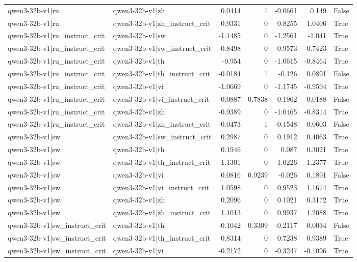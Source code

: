 \begin{table}
\begin{tabular}{l l r r r r l}
qwen3-32b-v1|ru & qwen3-32b-v1|zh & 0.0414 & 1 & -0.0661 & 0.149 & False \\
qwen3-32b-v1|ru & qwen3-32b-v1|zh_instruct_crit & 0.9331 & 0 & 0.8255 & 1.0406 & True \\
qwen3-32b-v1|ru_instruct_crit & qwen3-32b-v1|sw & -1.1485 & 0 & -1.2561 & -1.041 & True \\
qwen3-32b-v1|ru_instruct_crit & qwen3-32b-v1|sw_instruct_crit & -0.8498 & 0 & -0.9573 & -0.7423 & True \\
qwen3-32b-v1|ru_instruct_crit & qwen3-32b-v1|th & -0.954 & 0 & -1.0615 & -0.8464 & True \\
qwen3-32b-v1|ru_instruct_crit & qwen3-32b-v1|th_instruct_crit & -0.0184 & 1 & -0.126 & 0.0891 & False \\
qwen3-32b-v1|ru_instruct_crit & qwen3-32b-v1|vi & -1.0669 & 0 & -1.1745 & -0.9594 & True \\
qwen3-32b-v1|ru_instruct_crit & qwen3-32b-v1|vi_instruct_crit & -0.0887 & 0.7838 & -0.1962 & 0.0188 & False \\
qwen3-32b-v1|ru_instruct_crit & qwen3-32b-v1|zh & -0.9389 & 0 & -1.0465 & -0.8314 & True \\
qwen3-32b-v1|ru_instruct_crit & qwen3-32b-v1|zh_instruct_crit & -0.0473 & 1 & -0.1548 & 0.0603 & False \\
qwen3-32b-v1|sw & qwen3-32b-v1|sw_instruct_crit & 0.2987 & 0 & 0.1912 & 0.4063 & True \\
qwen3-32b-v1|sw & qwen3-32b-v1|th & 0.1946 & 0 & 0.087 & 0.3021 & True \\
qwen3-32b-v1|sw & qwen3-32b-v1|th_instruct_crit & 1.1301 & 0 & 1.0226 & 1.2377 & True \\
qwen3-32b-v1|sw & qwen3-32b-v1|vi & 0.0816 & 0.9239 & -0.026 & 0.1891 & False \\
qwen3-32b-v1|sw & qwen3-32b-v1|vi_instruct_crit & 1.0598 & 0 & 0.9523 & 1.1674 & True \\
qwen3-32b-v1|sw & qwen3-32b-v1|zh & 0.2096 & 0 & 0.1021 & 0.3172 & True \\
qwen3-32b-v1|sw & qwen3-32b-v1|zh_instruct_crit & 1.1013 & 0 & 0.9937 & 1.2088 & True \\
qwen3-32b-v1|sw_instruct_crit & qwen3-32b-v1|th & -0.1042 & 0.3309 & -0.2117 & 0.0034 & False \\
qwen3-32b-v1|sw_instruct_crit & qwen3-32b-v1|th_instruct_crit & 0.8314 & 0 & 0.7238 & 0.9389 & True \\
qwen3-32b-v1|sw_instruct_crit & qwen3-32b-v1|vi & -0.2172 & 0 & -0.3247 & -0.1096 & True \\

\end{tabular}
\end{table}
